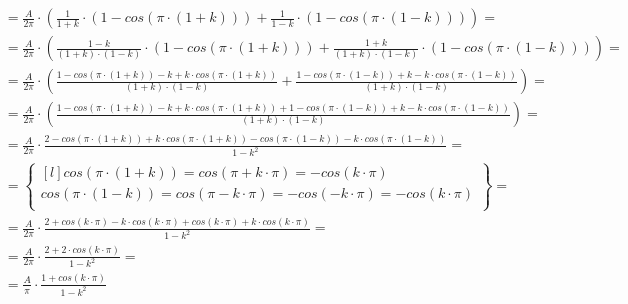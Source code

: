 \begin{task}
\begin{align*}
&=\frac{A}{2\pi} \cdot \left(\frac{1}{1+k} \cdot \left( 1 - cos\left(\pi \cdot \left(1+k\right) \right) \right)+ \frac{1}{1-k} \cdot \left( 1 - cos\left(\pi \cdot \left(1-k\right)\right) \right) \right)=\\
&=\frac{A}{2\pi} \cdot \left(\frac{1-k}{\left(1+k\right)\cdot\left(1-k\right)} \cdot \left( 1 - cos\left(\pi \cdot \left(1+k\right) \right) \right)+ \frac{1+k}{\left(1+k\right)\cdot\left(1-k\right)} \cdot \left( 1 - cos\left(\pi \cdot \left(1-k\right)\right) \right) \right)=\\
&=\frac{A}{2\pi} \cdot \left(\frac{1 - cos\left(\pi \cdot \left(1+k\right) \right)- k + k\cdot cos\left(\pi \cdot \left(1+k\right) \right)}{\left(1+k\right)\cdot\left(1-k\right)} + \frac{1 - cos\left(\pi \cdot \left(1-k\right)\right)+ k - k\cdot cos\left(\pi \cdot \left(1-k\right)\right)}{\left(1+k\right)\cdot\left(1-k\right)} \right)=\\
&=\frac{A}{2\pi} \cdot \left(\frac{1 - cos\left(\pi \cdot \left(1+k\right) \right)- k + k\cdot cos\left(\pi \cdot \left(1+k\right) \right) + 1 - cos\left(\pi \cdot \left(1-k\right)\right)+ k - k\cdot cos\left(\pi \cdot \left(1-k\right)\right)}{\left(1+k\right)\cdot\left(1-k\right)} \right)=\\
&=\frac{A}{2\pi} \cdot \frac{2 - cos\left(\pi \cdot \left(1+k\right) \right) + k\cdot cos\left(\pi \cdot \left(1+k\right) \right) - cos\left(\pi \cdot \left(1-k\right)\right) - k\cdot cos\left(\pi \cdot \left(1-k\right)\right)}{1-k^2}=\\
&=\begin{Bmatrix*}[l]
cos\left(\pi\cdot\left(1+k\right)\right)=cos\left(\pi+k \cdot\pi\right)=-cos\left(k\cdot\pi\right)\\
cos\left(\pi\cdot\left(1-k\right)\right)=cos\left(\pi-k \cdot\pi\right)=-cos\left(-k\cdot\pi\right) = -cos\left(k\cdot\pi\right)\\
\end{Bmatrix*}=\\
&=\frac{A}{2\pi} \cdot \frac{2 + cos\left(k\cdot\pi \right) - k\cdot cos\left(k\cdot\pi \right) + cos\left(k\cdot\pi\right) + k\cdot cos\left(k\cdot\pi\right)}{1-k^2}=\\
&=\frac{A}{2\pi} \cdot \frac{2 + 2\cdot cos\left(k\cdot\pi \right)}{1-k^2}=\\
&=\frac{A}{\pi} \cdot \frac{1 + cos\left(k\cdot\pi \right)}{1-k^2}
\end{align*}



\end{task}
